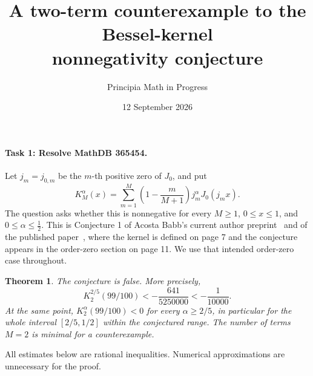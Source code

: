 \documentclass[11pt]{article}
\title{A two-term counterexample to the Bessel-kernel\\
nonnegativity conjecture}
\author{Principia Math in Progress}
\date{12 September 2026}
\newtheorem{theorem}{Theorem}
\newcommand{\J}{J_0}
\begin{document}
\maketitle

\paragraph{Task 1: Resolve MathDB 365454.}
Let \(j_m=j_{0,m}\) be the \(m\)-th positive zero of \(\J\), and put
\[
 K_M^\alpha(x)=
 \sum_{m=1}^M\left(1-\frac{m}{M+1}\right)j_m^\alpha\J(j_mx).
\]
The question asks whether this is nonnegative for every
\(M\ge1\), \(0\le x\le1\), and \(0\le\alpha\le\tfrac12\).
This is Conjecture 1 of Acosta Babb's current author preprint~\cite{preprint}
and of the published paper~\cite{published}, where the kernel is defined
on page 7 and the conjecture appears in the order-zero section on page 11.
We use that intended order-zero case throughout.

\begin{theorem}
The conjecture is false. More precisely,
\[
 K_2^{2/5}(99/100)
 < -\frac{641}{5250000}<-\frac1{10000}.
\]
At the same point, \(K_2^\alpha(99/100)<0\) for every
\(\alpha\ge2/5\), in particular for the whole interval
\([2/5,1/2]\) within the conjectured range. The number of terms \(M=2\)
is minimal for a counterexample.
\end{theorem}

All estimates below are rational inequalities. Numerical approximations
are unnecessary for the proof.
\end{document}
